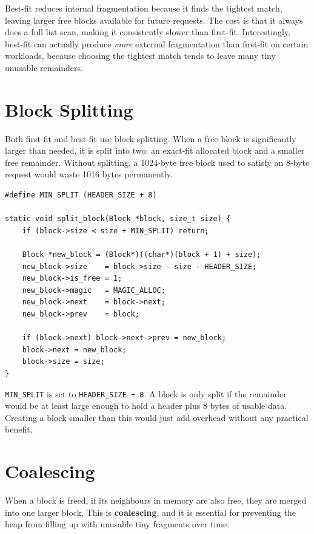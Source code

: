 \documentclass[12pt, a4paper]{report}
\begin{document}
Best-fit reduces internal fragmentation because it finds the tightest match,
leaving larger free blocks available for future requests. The cost is that it
always does a full list scan, making it consistently slower than first-fit.
Interestingly, best-fit can actually produce \textit{more} external fragmentation
than first-fit on certain workloads, because choosing the tightest match tends
to leave many tiny unusable remainders.

\section{Block Splitting}

Both first-fit and best-fit use block splitting. When a free block is
significantly larger than needed, it is split into two: an exact-fit allocated
block and a smaller free remainder. Without splitting, a 1024-byte free block
used to satisfy an 8-byte request would waste 1016 bytes permanently.

\begin{lstlisting}
#define MIN_SPLIT (HEADER_SIZE + 8)

static void split_block(Block *block, size_t size) {
    if (block->size < size + MIN_SPLIT) return;

    Block *new_block = (Block*)((char*)(block + 1) + size);
    new_block->size    = block->size - size - HEADER_SIZE;
    new_block->is_free = 1;
    new_block->magic   = MAGIC_ALLOC;
    new_block->next    = block->next;
    new_block->prev    = block;

    if (block->next) block->next->prev = new_block;
    block->next = new_block;
    block->size = size;
}
\end{lstlisting}

\texttt{MIN\_SPLIT} is set to \texttt{HEADER\_SIZE + 8}. A block is only split
if the remainder would be at least large enough to hold a header plus 8 bytes of
usable data. Creating a block smaller than this would just add overhead without
any practical benefit.

\section{Coalescing}

When a block is freed, if its neighbours in memory are also free, they are
merged into one larger block. This is \textbf{coalescing}, and it is essential
for preventing the heap from filling up with unusable tiny fragments over time:
\end{document}
